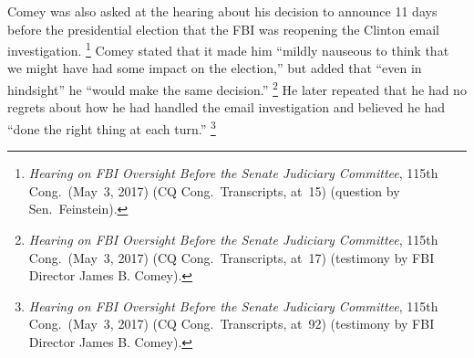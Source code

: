 Comey was also asked at the hearing about his decision to announce 11 days before the presidential election that the FBI was reopening the Clinton email investigation.%
\footnote{\textit{Hearing on FBI Oversight Before the Senate Judiciary Committee}, 115th Cong.\ (May~3, 2017) (CQ Cong.\ Transcripts, at~15) (question by Sen.~Feinstein).}
Comey stated that it made him ``mildly nauseous to think that we might have had some impact on the election,'' but added that ``even in hindsight'' he ``would make the same decision.''%
\footnote{\textit{Hearing on FBI Oversight Before the Senate Judiciary Committee}, 115th Cong.\ (May~3, 2017) (CQ Cong.\ Transcripts, at~17) (testimony by FBI Director James B. Comey).}
He later repeated that he had no regrets about how he had handled the email investigation and believed he had ``done the right thing at each turn.''%
\footnote{\textit{Hearing on FBI Oversight Before the Senate Judiciary Committee}, 115th Cong.\ (May~3, 2017) (CQ Cong.\ Transcripts, at~92) (testimony by FBI Director James B. Comey).}


